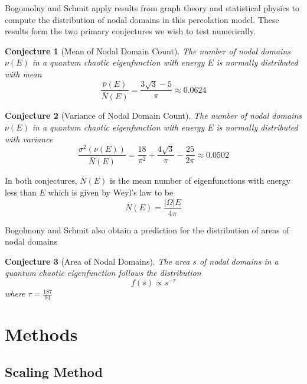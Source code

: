 \documentclass{report}
\begin{document}
Bogomolny and Schmit apply results from graph theory and statistical physics to compute the distribution of nodal domains in this percolation model. These results form the two primary conjectures we wish to test numerically.

\newtheorem{conj}{Conjecture}
\begin{conj}[Mean of Nodal Domain Count]
  The number of nodal domains $\nu(E)$ in a quantum chaotic eigenfunction with energy $E$ is normally distributed with mean
  \begin{equation}
    \label{eq:mean_prediction}
    \frac{\bar{\nu}(E)}{\bar{N}(E)} = \frac{3 \sqrt{3} - 5}{\pi} \approx 0.0624
  \end{equation}
\end{conj}

\begin{conj}[Variance of Nodal Domain Count]
  The number of nodal domains $\nu(E)$ in a quantum chaotic eigenfunction with energy $E$ is normally distributed with variance
  \begin{equation}
    \label{eq:variance_prediction}
    \frac{\sigma^{2}(\nu(E))}{\bar{N}(E)} = \frac{18}{\pi^{2}} + \frac{4 \sqrt{3}}{\pi} - \frac{25}{2 \pi} \approx 0.0502
  \end{equation}
\end{conj}  

In both conjectures, $\bar{N}(E)$ is the mean number of eigenfunctions with energy less than $E$ which is given by Weyl's law \cite{garabedian} to be
\[
\bar{N}(E) = \frac{\vert \Omega \vert E}{4 \pi}
\]

Bogolmony and Schmit also obtain a prediction for the distribution of areas of nodal domains

\begin{conj}[Area of Nodal Domains]
  The area $s$ of nodal domains in a quantum chaotic eigenfunction follows the distribution
  \begin{equation}
    \label{eq:area_prediction}
    f(s) \propto s^{-\tau}
  \end{equation}
  where $\tau = \frac{187}{91}$
\end{conj}

\chapter{Methods}
\section{Scaling Method}
\end{document}
